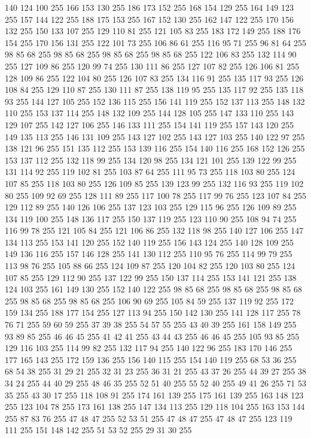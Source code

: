 140 124 100 255 166 153 130 255 186 173 152 255 168 154 129 255 164 149 123 255 157 144 122 255 188 175 153 255 167 152 130 255 162 147 122 255 170 156 132 255 150 133 107 255 129 110 81 255 121 105 83 255 183 172 149 255 188 176 154 255 170 156 131 255 122 101 73 255 106 86 61 255 116 95 71 255 96 81 64 255 98 85 68 255 98 85 68 255 98 85 68 255 98 85 68 255 122 106 83 255 132 114 90 255 127 109 86 255 120 99 74 255 130 111 86 255 127 107 82 255 126 106 81 255 128 109 86 255 122 104 80 255 126 107 83 255 134 116 91 255 135 117 93 255 126 108 84 255 129 110 87 255 130 111 87 255 138 119 95 255 135 117 92 255 135 118 93 255 144 127 105 255 152 136 115 255 156 141 119 255 152 137 113 255 148 132 110 255 153 137 114 255 148 132 109 255 144 128 105 255 147 133 110 255 143 129 107 255 142 127 106 255 146 133 111 255 154 141 119 255 157 143 120 255 149 135 113 255 146 131 109 255 143 127 102 255 143 127 103 255 140 122 97 255 138 121 96 255 151 135 112 255 153 139 116 255
154 140 116 255 168 152 126 255 153 137 112 255 132 118 99 255 134 120 98 255 134 121 101 255 139 122 99 255 131 114 92 255 119 102 81 255 103 87 64 255 111 95 73 255 118 103 80 255 124 107 85 255 118 103 80 255 126 109 85 255 139 123 99 255 132 116 93 255 119 102 80 255 109 92 69 255 128 111 89 255 117 100 78 255 117 99 76 255 123 107 84 255 129 112 89 255 140 126 106 255 137 123 103 255 129 115 96 255 126 109 89 255 134 119 100 255 148 136 117 255 150 137 119 255 123 110 90 255 108 94 74 255 116 99 78 255 121 105 84 255 121 106 86 255 132 118 98 255 140 127 106 255 147 134 113 255 153 141 120 255 152 140 119 255 156 143 124 255 140 128 109 255 149 136 116 255 157 146 128 255 141 130 112 255 110 95 76 255 114 99 79 255 113 98 76 255 105 88 66 255 124 109 87 255 120 104 82 255 120 103 80 255 124 107 85 255 129 112 90 255 137 122 99 255 150 137 114 255 153 141 121 255 138 124 103 255 161 149 130 255 152 140 122 255 98 85 68 255 98 85 68 255 98 85 68 255
98 85 68 255 98 85 68 255 106 90 69 255 105 84 59 255 137 119 92 255 172 159 134 255 188 177 154 255 127 113 94 255 150 142 130 255 141 128 117 255 78 76 71 255 59 60 59 255 37 39 38 255 54 57 55 255 43 40 39 255 161 158 149 255 93 89 85 255 46 46 45 255 41 42 41 255 43 44 43 255 46 46 45 255 105 93 85 255 129 116 103 255 114 99 82 255 132 117 94 255 140 122 96 255 183 170 146 255 177 165 143 255 172 159 136 255 156 140 115 255 154 140 119 255 68 53 36 255 68 54 38 255 31 29 21 255 32 31 23 255 36 31 21 255 43 37 26 255 44 39 27 255 38 34 24 255 44 40 29 255 48 46 35 255 52 51 40 255 55 52 40 255 49 41 26 255 71 53 35 255 43 30 17 255 118 108 91 255 174 161 139 255 175 161 139 255 163 148 123 255 123 104 78 255 173 161 138 255 147 134 113 255 129 118 104 255 163 153 144 255 87 83 76 255 47 48 47 255 52 53 51 255 47 48 47 255 47 48 47 255 123 119 111 255 151 148 142 255 51 53 52 255 29 31 30 255
